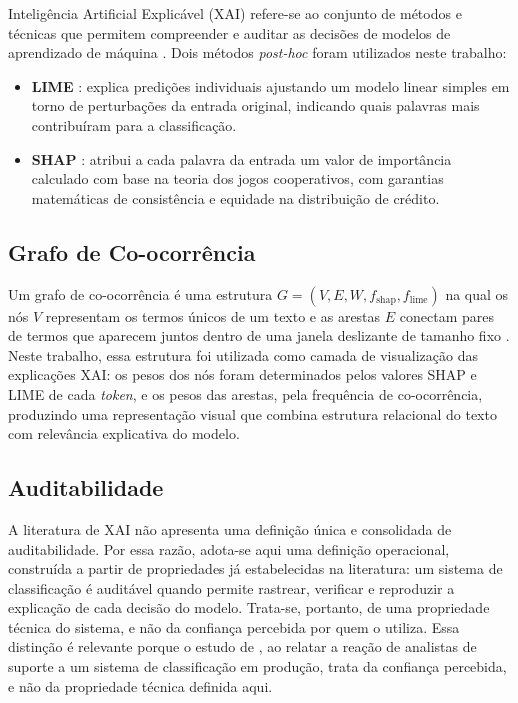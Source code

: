 \documentclass[
    12pt,                %
    openright,           %
    oneside,             %
    a4paper,             %
    english,             %
    brazil               %
]{abntex2}
\begin{document}
Inteligência Artificial Explicável (XAI) refere-se ao conjunto de métodos e técnicas que permitem compreender e auditar as decisões de modelos de aprendizado de máquina \cite{salih2023}. Dois métodos \textit{post-hoc} foram utilizados neste trabalho:
 
\begin{itemize}
    \item \textbf{LIME} \cite{ribeiro2016}: explica predições individuais ajustando um modelo linear simples em torno de perturbações da entrada original, indicando quais palavras mais contribuíram para a classificação.
 
    \item \textbf{SHAP} \cite{lundberg2017}: atribui a cada palavra da entrada um valor de importância calculado com base na teoria dos jogos cooperativos, com garantias matemáticas de consistência e equidade na distribuição de crédito.
\end{itemize}
 
\subsection{Grafo de Co-ocorrência}
 
Um grafo de co-ocorrência é uma estrutura $G = (V, E, W, f_{\text{shap}}, f_{\text{lime}})$ na qual os nós $V$ representam os termos únicos de um texto e as arestas $E$ conectam pares de termos que aparecem juntos dentro de uma janela deslizante de tamanho fixo \cite{yao2019}. 
Neste trabalho, essa estrutura foi utilizada como camada de visualização das explicações XAI: os pesos dos nós foram determinados pelos valores SHAP e LIME de cada \textit{token}, e os pesos das arestas, pela frequência de co-ocorrência, produzindo uma representação visual que combina estrutura relacional do texto com relevância explicativa do modelo.

\subsection{Auditabilidade}
\label{subsec:auditabilidade}

A literatura de XAI não apresenta uma definição única e consolidada de
auditabilidade. Por essa razão, adota-se aqui uma definição operacional,
construída a partir de propriedades já estabelecidas na literatura: um
sistema de classificação é auditável quando permite rastrear, verificar
e reproduzir a explicação de cada decisão do modelo. Trata-se, portanto,
de uma propriedade técnica do sistema, e não da confiança percebida por
quem o utiliza. Essa distinção é relevante porque o estudo de , 
ao relatar a reação de analistas de suporte a um sistema de classificação 
em produção, trata da confiança percebida, e não da propriedade técnica definida aqui.
\end{document}

